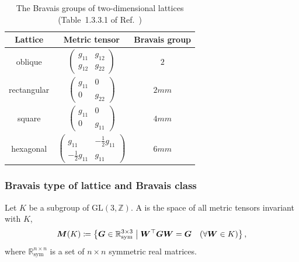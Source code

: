 \begin{table}[htb]
  \centering
  \caption{The Bravais groups of two-dimensional lattices (Table~1.3.3.1 of Ref.~\cite{ITA2016})}
  \label{tab:two-dimensional-Bravais-groups}
  \begin{tabular}{ccc}
    \hline\hline
    Lattice & Metric tensor & Bravais group \\ \hline
    oblique & $\begin{pmatrix} g_{11} & g_{12} \\ g_{12} & g_{22} \end{pmatrix}$ & $2$ \\
    rectangular & $\begin{pmatrix} g_{11} & 0 \\ 0 & g_{22} \end{pmatrix}$ & $2mm$ \\
    square & $\begin{pmatrix} g_{11} & 0 \\ 0 & g_{11} \end{pmatrix}$ & $4mm$ \\
    hexagonal & $\begin{pmatrix} g_{11} & -\frac{1}{2} g_{11} \\ -\frac{1}{2} g_{11} & g_{11} \end{pmatrix}$ & $6mm$ \\
    \hline\hline
  \end{tabular}
\end{table}

\subsubsection{Bravais type of lattice and Bravais class}

\begin{screen}
  \begin{defn}
    Let $K$ be a subgroup of $\mathrm{GL}(3, \mathbb{Z})$.
    A  is the space of all metric tensors invariant with $K$,
    \begin{align}
      \bm{M}( K ) \coloneqq \left\{  \bm{G} \in \mathbb{R}^{3 \times 3}_{\mathrm{sym}}  \mathrel{}\middle|\mathrel{}  \bm{W}^{\top}\bm{G}\bm{W} = \bm{G} \quad (\forall \bm{W} \in K )  \right\},
    \end{align}
    where $\mathbb{R}^{n \times n}_{\mathrm{sym}}$ is a set of $n \times n$ symmetric real matrices.
  \end{defn}
\end{screen}

